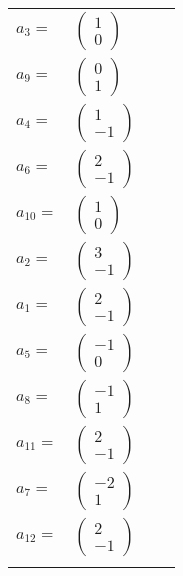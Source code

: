 \documentclass[1p]{elsarticle_modified}
\theoremstyle{definition}
\begin{document}
\begin{tabular}{m{7pt} m{180pt} m{7pt} m{180pt} }
\flushright $a_{3}=$&$\begin{pmatrix}1\\0\end{pmatrix}$ \\
\flushright $a_{9}=$&$\begin{pmatrix}0\\1\end{pmatrix}$ \\
\flushright $a_{4}=$&$\begin{pmatrix}1\\-1\end{pmatrix}$ \\
\flushright $a_{6}=$&$\begin{pmatrix}2\\-1\end{pmatrix}$ \\
\flushright $a_{10}=$&$\begin{pmatrix}1\\0\end{pmatrix}$ \\
\flushright $a_{2}=$&$\begin{pmatrix}3\\-1\end{pmatrix}$ \\
\flushright $a_{1}=$&$\begin{pmatrix}2\\-1\end{pmatrix}$ \\
\flushright $a_{5}=$&$\begin{pmatrix}-1\\0\end{pmatrix}$ \\
\flushright $a_{8}=$&$\begin{pmatrix}-1\\1\end{pmatrix}$ \\
\flushright $a_{11}=$&$\begin{pmatrix}2\\-1\end{pmatrix}$ \\
\flushright $a_{7}=$&$\begin{pmatrix}-2\\1\end{pmatrix}$ \\
\flushright $a_{12}=$&$\begin{pmatrix}2\\-1\end{pmatrix}$\\&\end{tabular}
\end{document}
